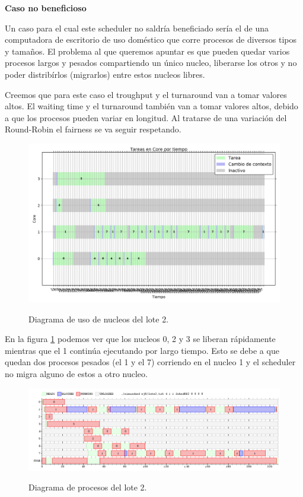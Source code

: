 \textbf{Caso no beneficioso}
\\
\par Un caso para el cual este scheduler no saldría beneficiado sería el de una computadora de escritorio de uso doméstico que corre procesos de diversos tipos y tamaños. El problema al que queremos apuntar es que pueden quedar varios procesos largos y pesados compartiendo un único nucleo, liberarse los otros y no poder distribírlos (migrarlos) entre estos nucleos libres.
\par Creemos que para este caso el troughput y el turnaround van a tomar valores altos. El waiting time y el turnaround también van a tomar valores altos, debido a que los procesos pueden variar en longitud. Al tratarse de una variación del Round-Robin el fairness se va seguir respetando. \\

\begin{figure}[h]
  \centering
    \includegraphics[width=1\textwidth]{images/ej8/lote2_cores.png}
  \label{fig: lote8_2_cores}
  \caption{Diagrama de uso de nucleos del lote 2.}
\end{figure}

\par En la figura \ref{fig: lote8_2_cores} podemos ver que los nucleos 0, 2 y 3 se liberan rápidamente mientras que el 1 continúa ejecutando por largo tiempo. Esto se debe a que quedan dos procesos pesados (el 1 y el 7) corriendo en el nucleo 1 y el scheduler no migra alguno de estos a otro nucleo.

\begin{figure}[h]
  \centering
    \includegraphics[width=1\textwidth]{images/ej8/lote2_sched.png}
  \label{fig: lote8_2_sched}
  \caption{Diagrama de procesos del lote 2.}
\end{figure}

